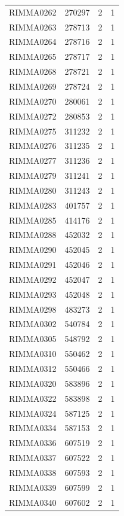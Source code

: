 \documentclass[11pt]{article}
\newcounter{rowno}
\begin{document}
\begin{scriptsize}
\begin{longtable}{>{\stepcounter{rowno}}cccc}
    RIMMA0262 & 270297 & 2     & 1 \\
    RIMMA0263 & 278713 & 2     & 1 \\
    RIMMA0264 & 278716 & 2     & 1 \\
    RIMMA0265 & 278717 & 2     & 1 \\
    RIMMA0268 & 278721 & 2     & 1 \\
    RIMMA0269 & 278724 & 2     & 1 \\
    RIMMA0270 & 280061 & 2     & 1 \\
    RIMMA0272 & 280853 & 2     & 1 \\
    RIMMA0275 & 311232 & 2     & 1 \\
    RIMMA0276 & 311235 & 2     & 1 \\
    RIMMA0277 & 311236 & 2     & 1 \\
    RIMMA0279 & 311241 & 2     & 1 \\
    RIMMA0280 & 311243 & 2     & 1 \\
    RIMMA0283 & 401757 & 2     & 1 \\
    RIMMA0285 & 414176 & 2     & 1 \\
    RIMMA0288 & 452032 & 2     & 1 \\
    RIMMA0290 & 452045 & 2     & 1 \\
    RIMMA0291 & 452046 & 2     & 1 \\
    RIMMA0292 & 452047 & 2     & 1 \\
    RIMMA0293 & 452048 & 2     & 1 \\
    RIMMA0298 & 483273 & 2     & 1 \\
    RIMMA0302 & 540784 & 2     & 1 \\
    RIMMA0305 & 548792 & 2     & 1 \\
    RIMMA0310 & 550462 & 2     & 1 \\
    RIMMA0312 & 550466 & 2     & 1 \\
    RIMMA0320 & 583896 & 2     & 1 \\
    RIMMA0322 & 583898 & 2     & 1 \\
    RIMMA0324 & 587125 & 2     & 1 \\
    RIMMA0334 & 587153 & 2     & 1 \\
    RIMMA0336 & 607519 & 2     & 1 \\
    RIMMA0337 & 607522 & 2     & 1 \\
    RIMMA0338 & 607593 & 2     & 1 \\
    RIMMA0339 & 607599 & 2     & 1 \\
    RIMMA0340 & 607602 & 2     & 1 \\

\end{longtable}
\end{scriptsize}
\end{document}
